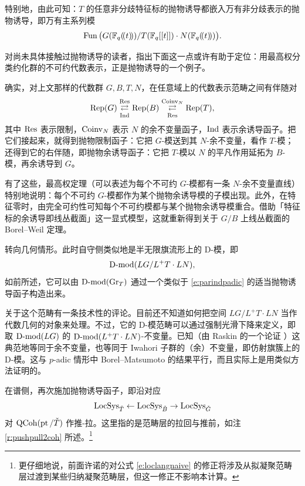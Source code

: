 特别地，由此可知：$T$ 的任意非分歧特征标的抛物诱导都嵌入万有非分歧表示的抛物诱导，即万有主系列模
%
\[
	    \operatorname{Fun}\big( G(\mathbb{F}_q(\!(t)\!)) / T(\mathbb{F}_q[[t]]) \cdot N(\mathbb{F}_q(\!(t)\!))\big).
\]
%

\begin{re} 对尚未具体接触过抛物诱导的读者，指出下面这一点或许有助于定位：用最高权分类约化群的不可约代数表示，正是抛物诱导的一个例子。

确实，对上文那样的代数群 $G,B,T,N$，在任意域上的代数表示范畴之间有伴随对
%
\[
	    \operatorname{Rep}(G) \overset{\operatorname{Res}}{\underset{\operatorname{Ind}}{\rightleftarrows}}
	    \operatorname{Rep}(B)
	    \overset{\operatorname{Coinv}_N}{\underset{\operatorname{Res}}{\rightleftarrows}}
	    \operatorname{Rep}(T),
\]
%
其中 $\operatorname{Res}$ 表示限制，$\operatorname{Coinv}_N$ 表示 $N$ 的余不变量函子，$\operatorname{Ind}$ 表示余诱导函子。把它们接起来，就得到抛物限制函子：它把 $G$-模送到其 $N$-余不变量，看作 $T$-模；还得到它的右伴随，即抛物余诱导函子：它把 $T$-模以 $N$ 的平凡作用延拓为 $B$-模，再余诱导到 $G$。

有了这些，最高权定理（可以表述为每个不可约 $G$-模都有一条 $N$-余不变量直线）特别地说明：每个不可约 $G$-模都作为某个抛物余诱导模的子模出现。此外，在特征零时，由完全可约性可知每个不可约模都与某个抛物余诱导模重合。借助「特征标的余诱导即线丛截面」这一显式模型，这就重新得到关于 $G/B$ 上线丛截面的 Borel--Weil 定理。 \end{re}


\ssszh 转向几何情形。此时自守侧类似地是半无限旗流形上的 D-模，即
\[
	  \operatorname{D-mod}( LG / L^+ T \cdot LN),
\]
%
如前所述，它可以由 $\operatorname{D-mod}(\operatorname{Gr}_T)$ 通过一个类似于 \eqref{e:parindpadic} 的适当抛物诱导函子构造出来。

\begin{re} 关于这个范畴有一条技术性的评论。目前还不知道如何把空间 $LG/L^+T \cdot LN$ 当作代数几何的对象来处理。不过，它的 D-模范畴可以通过强制光滑下降来定义，即取 $\operatorname{D-mod}(LG)$ 的 $\operatorname{D-mod}(L^+T \cdot LN)$-不变量。已知（由 Raskin 的一个论证 \cite{raskin2ndadjoint}）这典范地等同于余不变量，也等同于 Iwahori 子群的（余）不变量，即仿射旗簇上的 D-模。这与 $p$-adic 情形中 Borel--Matsumoto 的结果平行，而且实际上是用类似方法证明的。
\end{re}



\ssszh 在谱侧，再次施加抛物诱导函子，即沿对应
 \[
	    \operatorname{LocSys}_{\check{T}} \leftarrow \operatorname{LocSys}_{\check{B}} \rightarrow
	    \operatorname{LocSys}_{\check{G}}
 \]
 对 $\operatorname{QCoh}(\operatorname{pt}/\check{T})$ 作推-拉。这里指的是范畴层的拉回与推前，如注 \ref{r:pushpull2coh} 所述。\footnote{更仔细地说，前面许诺的对公式 \eqref{e:loclangnaive} 的修正将涉及从拟凝聚范畴层过渡到某些归纳凝聚范畴层，但这一修正不影响本计算。}




